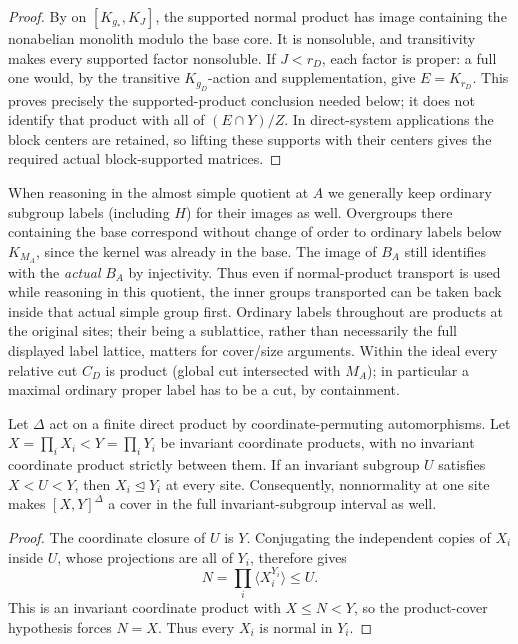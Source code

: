\begin{proof}
By  on \([K_{g_*},K_J]\), the supported normal
product has image containing the nonabelian monolith modulo the base
core.  It is nonsoluble, and transitivity makes every supported factor
nonsoluble.  If \(J<r_D\), each factor is proper: a full one would,
by the transitive \(K_{g_D}\)-action and supplementation, give
\(E=K_{r_D}\).  This proves precisely the supported-product conclusion
needed below; it does not identify that product with all of
\((E\cap Y)/Z\).  In direct-system applications the block centers
are retained, so lifting these supports with their centers gives
the required actual block-supported matrices.

\end{proof}

\begin{remark}\label{fa:quotient-labels}

When reasoning in the almost simple quotient at \(A\) we generally keep ordinary subgroup labels
(including \(H\)) for their images as well. Overgroups there containing the base correspond without
change of order to ordinary labels below \(K_{M_A}\), since the kernel was already in the base. The image
of \(B_A\) still identifies with the \emph{actual} \(B_A\) by injectivity. Thus even if normal-product
transport is used while reasoning in this quotient, the inner groups transported can be taken back inside
that actual simple group first. Ordinary labels throughout are products at the original sites; their
being a sublattice, rather than necessarily the full displayed label lattice, matters for cover/size
arguments. Within the ideal every relative cut \(C_D\) is product (global cut intersected with \(M_A\));
in particular a maximal ordinary proper label has to be a cut, by containment.

\end{remark}

\begin{lemma}\label{fa:product-cover}
Let \(\Delta\) act on a finite direct product by coordinate-permuting
automorphisms.  Let \(X=\prod_i X_i<Y=\prod_i Y_i\) be invariant
coordinate products, with no invariant coordinate product strictly
between them.  If an invariant subgroup \(U\) satisfies \(X<U<Y\),
then \(X_i\trianglelefteq Y_i\) at every site.  Consequently,
nonnormality at one site makes \([X,Y]^\Delta\) a cover in the full
invariant-subgroup interval as well.
\end{lemma}

\begin{proof}
The coordinate closure of \(U\) is \(Y\).  Conjugating the independent
copies of \(X_i\) inside \(U\), whose projections are all of \(Y_i\),
therefore gives
\[
 N=\prod_i\langle X_i^{Y_i}\rangle\le U.
\]
This is an invariant coordinate product with \(X\le N<Y\), so the
product-cover hypothesis forces \(N=X\).  Thus every \(X_i\) is
normal in \(Y_i\).
\end{proof}

